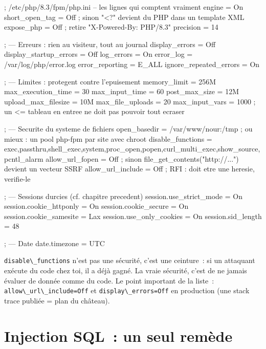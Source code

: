 \documentclass[12pt,a4paper,twoside,openright]{book}
\begin{document}
\begin{codeconf}
; /etc/php/8.3/fpm/php.ini  -- les lignes qui comptent vraiment
engine = On
short_open_tag = Off                 ; sinon "<?" devient du PHP dans un template XML
expose_php = Off                     ; retire "X-Powered-By: PHP/8.3"
precision = 14

; --- Erreurs : rien au visiteur, tout au journal
display_errors = Off
display_startup_errors = Off
log_errors = On
error_log = /var/log/php/error.log
error_reporting = E_ALL
ignore_repeated_errors = On

; --- Limites : protegent contre l'epuisement
memory_limit = 256M
max_execution_time = 30
max_input_time = 60
post_max_size = 12M
upload_max_filesize = 10M
max_file_uploads = 20
max_input_vars = 1000                ; un <= tableau en entree ne doit pas pouvoir tout ecraser

; --- Securite du systeme de fichiers
open_basedir = /var/www/nour:/tmp    ; ou mieux : un pool php-fpm par site avec chroot
disable_functions = exec,passthru,shell_exec,system,proc_open,popen,curl_multi_exec,show_source,pcntl_alarm
allow_url_fopen = Off                ; sinon file_get_contents("http://...") devient un vecteur SSRF
allow_url_include = Off              ; RFI : doit etre une heresie, verifie-le

; --- Sessions durcies (cf. chapitre precedent)
session.use_strict_mode = On
session.cookie_httponly = On
session.cookie_secure = On
session.cookie_samesite = Lax
session.use_only_cookies = On
session.sid_length = 48

; --- Date
date.timezone = UTC
\end{codeconf}

\begin{note}
\verb|disable\_functions| n'est pas une s\'ecurit\'e, c'est une ceinture~: si un attaquant ex\'ecute
du code chez toi, il a d\'ej\`a gagn\'e. La vraie s\'ecurit\'e, c'est de ne jamais \'evaluer de donn\'ee
comme du code. Le point important de la liste~: \verb|allow\_url\_include=Off| et
\verb|display\_errors=Off| en production (une stack trace publi\'ee = plan du ch\^ateau).
\end{note}

\section{Injection SQL~: un seul rem\`ede}
\end{document}
